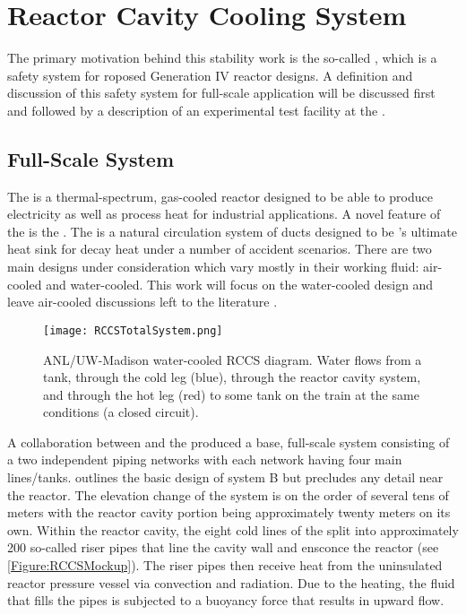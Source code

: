 \section{Reactor Cavity Cooling System}\label{Section:RCCS}
The primary motivation behind this stability work is the so-called , which is a safety system for roposed Generation IV reactor designs.
A definition and discussion of this safety system for full-scale application will be discussed first and followed by a description of an experimental test facility at the \TheUniversity.

\subsection{Full-Scale System}
The  is a thermal-spectrum, gas-cooled reactor designed to be able to produce electricity as well as process heat for industrial applications.
A novel feature of the  is the .
The  is a natural circulation system of ducts designed to be 's ultimate heat sink for decay heat under a number of accident scenarios.
There are two main designs under consideration which vary mostly in their working fluid: air-cooled and water-cooled.
This work will focus on the water-cooled  design and leave air-cooled discussions left to the literature \cite{bechtel_national_450_1993,atomics_gas_1996}.
\begin{figure}%
\centering
    \caption[ANL/UW-Madison water-cooled RCCS diagram]{   ANL/UW-Madison  water-cooled RCCS diagram.  
                Water flows from a tank, through the cold leg (blue), through the reactor cavity system, and through the hot leg (red) to some tank on the train at the same conditions (a closed circuit).}%
    \label{Figure:RCCSTotalSystem}%
    \texttt{[image: RCCSTotalSystem.png]}%
\end{figure}

A collaboration between  and the \TheUniversity{} produced a base, full-scale  system consisting of a two independent piping networks with each network having four main lines/tanks.
 outlines the basic design of system B but precludes any detail near the reactor.
The elevation change of the system is on the order of several tens of meters with the reactor cavity portion being approximately twenty meters on its own.
Within the reactor cavity, the eight cold lines of the  split into approximately 200 so-called riser pipes that line the cavity wall and ensconce the reactor (see \cref{Figure:RCCSMockup}).
The riser pipes then receive heat from the uninsulated reactor pressure vessel via convection and radiation.
Due to the heating, the fluid that fills the pipes is subjected to a buoyancy force that results in upward flow.

